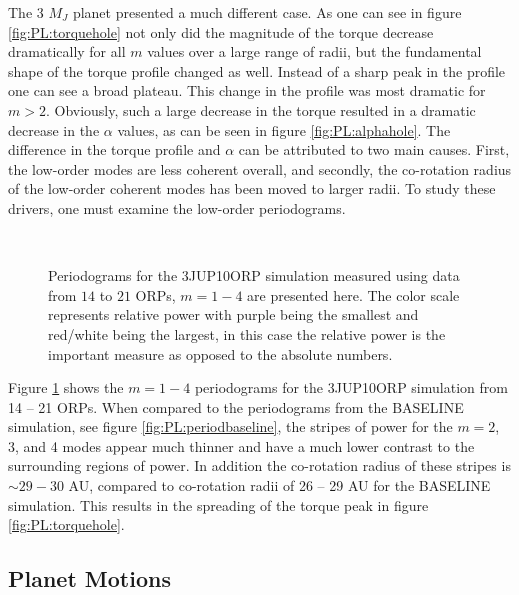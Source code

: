 The 3 $M_J$ planet presented a much different case. As one can see in figure \ref{fig:PL:torquehole} not only did the magnitude of the torque decrease dramatically for all $m$ values over a large range of radii, but the fundamental shape of the torque profile changed as well. Instead of a sharp peak in the profile one can see a broad plateau. This change in the profile was most dramatic for $m > 2$. Obviously, such a large decrease in the torque resulted in a dramatic decrease in the $\alpha$ values, as can be seen in figure \ref{fig:PL:alphahole}. The difference in the torque profile and $\alpha$ can be attributed to two main causes. First, the low-order modes are less coherent overall, and secondly, the co-rotation radius of the low-order coherent modes has been moved to larger radii. To study these drivers, one must examine the low-order periodograms.

\begin{figure}[p]
\centering
{}
\\
\caption[NEED TAGLINE]{Periodograms for the 3JUP10ORP simulation measured using data from $14$ to $21$ ORPs, $m = 1-4$ are presented here. The color scale represents relative power with purple being the smallest  and red/white being the largest, in this case the relative power is the important measure as opposed to the absolute numbers.}
\label{fig:PL:periodHOLE3JUP}
\end{figure}

Figure \ref{fig:PL:periodHOLE3JUP} shows the $m=1-4$ periodograms for the 3JUP10ORP simulation from 14 -- 21 ORPs. When compared to the periodograms from the BASELINE simulation, see figure \ref{fig:PL:periodbaseline}, the stripes of power for the $m = 2$, 3, and 4 modes appear much thinner and have a much lower contrast to the surrounding regions of power. In addition the co-rotation radius of these stripes is $\sim\!29 - 30$ AU, compared to co-rotation radii of 26 -- 29 AU for the BASELINE simulation. This results in the spreading of the torque peak in figure \ref{fig:PL:torquehole}.

\subsection{Planet Motions}\label{sec:PL:holemig}

